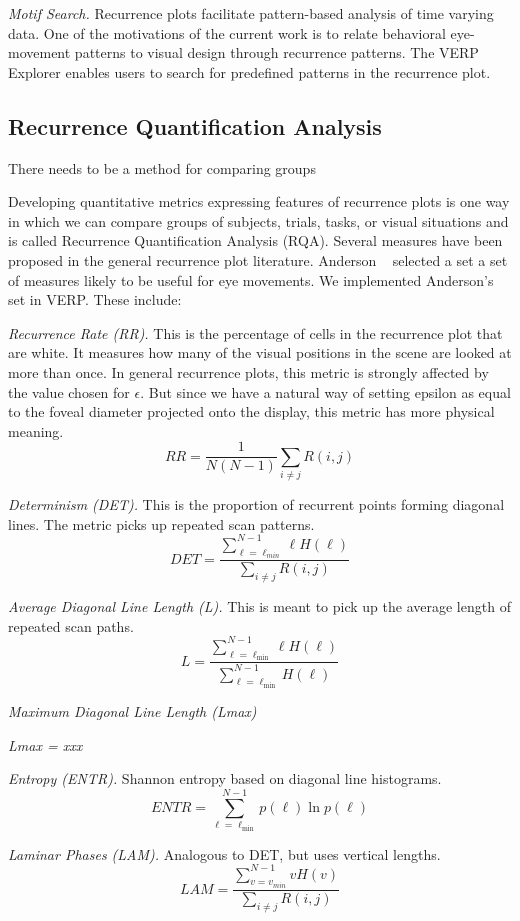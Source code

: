\documentclass{sigchi}
\begin{document}
\emph{Motif Search.} Recurrence plots facilitate pattern-based analysis of
time varying data. One of the motivations of the current work is to relate
behavioral eye-movement patterns to visual design through recurrence
patterns. The VERP Explorer enables users to search for predefined patterns
in the recurrence plot. 


\subsection{Recurrence Quantification Analysis} 
There needs to be a method for comparing groups

Developing quantitative metrics expressing features of recurrence plots is one way in which we can compare groups of subjects, trials, tasks, or visual situations and is called Recurrence Quantification Analysis (RQA).  Several measures have been proposed in the general recurrence plot literature. Anderson ~\cite{Anderson_2013} selected a set a set of measures likely to be useful for eye movements. We implemented Anderson's set in VERP. These include:

\emph{Recurrence Rate (RR).} This is the percentage of cells in the
recurrence plot that are white. It measures how many of the visual
positions in the scene are looked at more than once. In general recurrence
plots, this metric is strongly affected by the value chosen for $\epsilon$.
But since we have a natural way of setting epsilon as equal to the foveal
diameter projected onto the display, this metric has more physical meaning.
\[
	RR = {\frac{1}{N(N-1)}}{\sum_{i\neq j}{R(i,j)}}
\]

\emph{Determinism (DET).} This is the proportion of recurrent points
forming diagonal lines. The metric picks up repeated scan patterns.
\[
	DET = 
	\frac{
		\sum_{\ell=\ell_{min}}^{N-1}{\ell H(\ell)}
	}{
		\sum_{i\neq j} { R(i,j) }
	}
\]

\emph{Average Diagonal Line Length (L).} This is meant to pick up the
average length of repeated scan paths.
\[
	L = 
	\frac{
		\sum_{\ell=\ell_{\min} }^{ N-1 }{ \ell H(\ell) }
 	}{
		\sum_{\ell=\ell_{\min} }^{ N-1 }{ H(\ell) }
 	}
\]

\emph{Maximum Diagonal Line Length 
(Lmax)}

\emph{Lmax = xxx}

\emph{Entropy (ENTR).}  Shannon entropy based on diagonal line histograms.
\[
	ENTR = 
    \sum_{\ell = \ell_{\min}}^{N-1}{p(\ell)\ln p(\ell) }
\]
 
\emph{Laminar Phases (LAM).} Analogous to DET, but uses vertical lengths.
\[
	LAM =
	\frac{
		\sum_{v = v_{min} }^{N - 1} { vH(v) }
	}{
		\sum_{i\neq j}{ R(i,j)}
	}
\]
 
\end{document}
